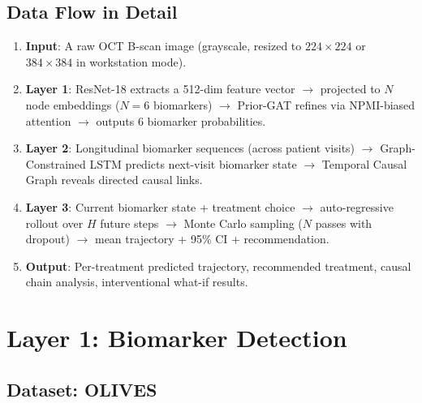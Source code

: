 \documentclass[12pt,a4paper]{article}
\begin{document}
\subsection{Data Flow in Detail}

\begin{enumerate}[nosep]
  \item \textbf{Input}: A raw OCT B-scan image (grayscale, resized to $224\times224$ or $384\times384$ in workstation mode).
  \item \textbf{Layer 1}: ResNet-18 extracts a 512-dim feature vector $\to$ projected to $N$ node embeddings ($N=6$ biomarkers) $\to$ Prior-GAT refines via NPMI-biased attention $\to$ outputs 6 biomarker probabilities.
  \item \textbf{Layer 2}: Longitudinal biomarker sequences (across patient visits) $\to$ Graph-Constrained LSTM predicts next-visit biomarker state $\to$ Temporal Causal Graph reveals directed causal links.
  \item \textbf{Layer 3}: Current biomarker state + treatment choice $\to$ auto-regressive rollout over $H$ future steps $\to$ Monte Carlo sampling ($N$ passes with dropout) $\to$ mean trajectory + 95\% CI + recommendation.
  \item \textbf{Output}: Per-treatment predicted trajectory, recommended treatment, causal chain analysis, interventional what-if results.
\end{enumerate}

\section{Layer 1: Biomarker Detection}

\subsection{Dataset: OLIVES}
\end{document}
